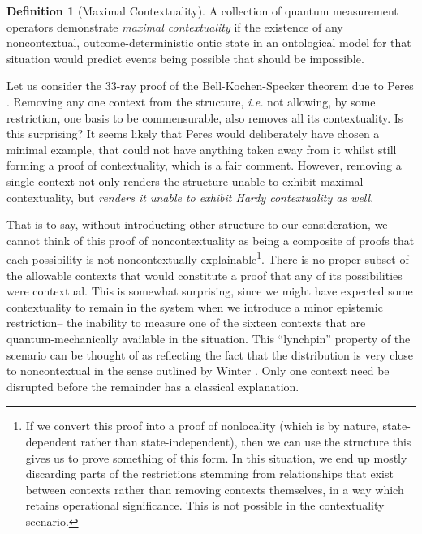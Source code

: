 \documentclass{amsart}
\theoremstyle{definition}
\newtheorem{defn}{Definition}
\begin{document}
\begin{defn}[Maximal Contextuality]
A collection of quantum measurement operators demonstrate \emph{maximal contextuality} if the existence of any noncontextual, outcome-deterministic ontic state in an ontological model for that situation would predict events being possible that should be impossible. %
\end{defn}



Let us consider the 33-ray proof of the Bell-Kochen-Specker theorem due to Peres \cite{Pere1991}. Removing any one context from the structure, \emph{i.e.} not allowing, by some restriction, one basis to be commensurable, also removes all its contextuality. Is this surprising? It seems likely that Peres would deliberately have chosen a minimal example, that could not have anything taken away from it whilst still forming a proof of contextuality, which is a fair comment. However, removing a single context not only renders the structure unable to exhibit maximal contextuality, but \emph{renders it unable to exhibit Hardy contextuality as well}.

That is to say, without introducting other structure to our consideration, we cannot think of this proof of noncontextuality as being a composite of proofs that each possibility is not noncontextually explainable\footnote{If we convert this proof into a proof of nonlocality (which is by nature, state-dependent rather than state-independent), then we can use the structure this gives us to prove something of this form. In this situation, we end up mostly %
discarding parts of the restrictions stemming from relationships that exist between contexts rather than removing contexts themselves, in a way which retains operational significance. This is not possible in the contextuality scenario.}. There is no proper subset of the allowable contexts that would constitute a proof that any of its possibilities were contextual. This is somewhat surprising, since we might have expected some contextuality to remain in the system when we introduce a minor epistemic restriction-- the inability to measure one of the sixteen contexts that are quantum-mechanically available in the situation. This ``lynchpin'' property of the scenario can be thought of as reflecting the fact that the distribution is very close to noncontextual in the sense outlined by Winter \cite{Wint2014}. Only one context need be disrupted before the remainder has a classical explanation.
\end{document}
